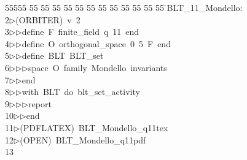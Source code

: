 %
%
\begin{tabbing}
55555 \= 55 \= 55 \= 55 \= 55 \= 55 \= 55 \= 55 \= 55 \= 55 \= 55 \= 55 \= 55 \= \>BLT\_11\_Mondello:\\[0pt]
2\>$\triangleright$\>(ORBITER)\ v\ 2\ \\[0pt]
3\>$\triangleright$\>$\triangleright$\>define\ F\ finite\_field\ q\ 11\ end\ \\[0pt]
4\>$\triangleright$\>$\triangleright$\>define\ O\ orthogonal\_space\ 0\ 5\ F\ end\ \\[0pt]
5\>$\triangleright$\>$\triangleright$\>define\ BLT\ BLT\_set\ \\[0pt]
6\>$\triangleright$\>$\triangleright$\>$\triangleright$\>space\ O\ family\ Mondello\ invariants\ \\[0pt]
7\>$\triangleright$\>$\triangleright$\>end\ \\[0pt]
8\>$\triangleright$\>$\triangleright$\>with\ BLT\ do\ blt\_set\_activity\ \\[0pt]
9\>$\triangleright$\>$\triangleright$\>$\triangleright$\>report\ \\[0pt]
10\>$\triangleright$\>$\triangleright$\>end\\[0pt]
11\>$\triangleright$\>(PDFLATEX)\ BLT\_Mondello\_q11tex\\[0pt]
12\>$\triangleright$\>(OPEN)\ BLT\_Mondello\_q11pdf\\[0pt]
13\>\end{tabbing}
